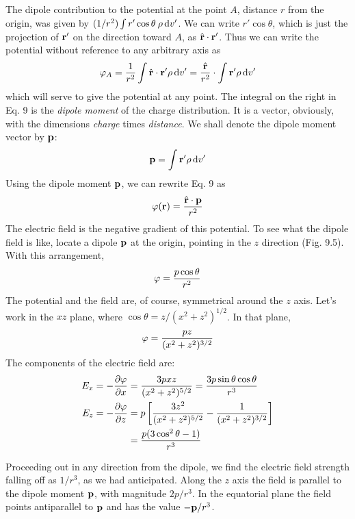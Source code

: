 The dipole contribution to the potential at the point $A$, distance
$r$ from the origin, was given by $(1/r^2)\int r' \cos \theta\:\rho\operatorname{d\!} v'$. We can write
$r' \cos \theta$, which is just the projection of $\mathbf{r}'$ on the direction toward $A$,
as $\hat{\mathbf{r}}\cdot\mathbf{r}'$. Thus we can write the potential without reference to any
arbitrary axis as
\begin{equation}
  \varphi_A = \frac{1}{r^2}\int \hat{\mathbf{r}}\cdot\mathbf{r}'\rho\operatorname{d\!} v'
      = \frac{\hat{\mathbf{r}}}{r^2}\cdot\int \mathbf{r}'\rho\operatorname{d\!} v'
\end{equation}
which will serve to give the potential at any point. The integral on
the right in Eq. 9 is the \emph{dipole moment} of the charge distribution. It
is a vector, obviously, with the dimensions \emph{charge} times \emph{distance}. We
shall denote the dipole moment vector by $\mathbf{p}$:
\begin{equation}
  \mathbf{p} = \int \mathbf{r}'\rho\operatorname{d\!} v'
\end{equation}
Using the dipole moment $\mathbf{p}$, we can rewrite Eq. 9 as
\begin{equation}
  \varphi(\mathbf{r}) = \frac{\hat{\mathbf{r}}\cdot\mathbf{p}}{r^2}
\end{equation}
The electric field is the negative gradient of this potential. To see
what the dipole field is like, locate a dipole $\mathbf{p}$ at the origin, pointing
in the $z$ direction (Fig. 9.5). With this arrangement,
\begin{equation}
  \varphi = \frac{p\cos\theta}{r^2}
\end{equation}
The potential and the field are, of course, symmetrical around the
$z$ axis. Let's work in the $xz$ plane, where $\cos \theta = z/ (x^2 + z^2)^{1/2}$. In
that plane,
\begin{equation}
  \varphi = \frac{pz}{(x^2 + z^2)^{3/2}}
\end{equation}
The components of the electric field are:
\begin{align}
\begin{split}
  E_x = -\frac{\partial\varphi}{\partial x} &= \frac{3pxz}{(x^2 + z^2)^{5/2}} = \frac{3p\sin\theta\cos\theta}{r^3} \\
  E_z = -\frac{\partial\varphi}{\partial z} 
   &= p\left[\frac{3z^2}{(x^2 + z^2)^{5/2}}-\frac{1}{(x^2 + z^2)^{3/2}}\right] \\
   &= \frac{p(3\cos^2\theta-1)}{r^3}
\end{split}
\end{align}

Proceeding out in any direction from the dipole, we find the electric
field strength falling off as $1/r^3$, as we had anticipated. Along
the $z$ axis the field is parallel to the dipole moment $\mathbf{p}$, with magnitude
$2p/r^3$. In the equatorial plane the field points antiparallel to $\mathbf{p}$ and
has the value $-\mathbf{p}/r^3$.

